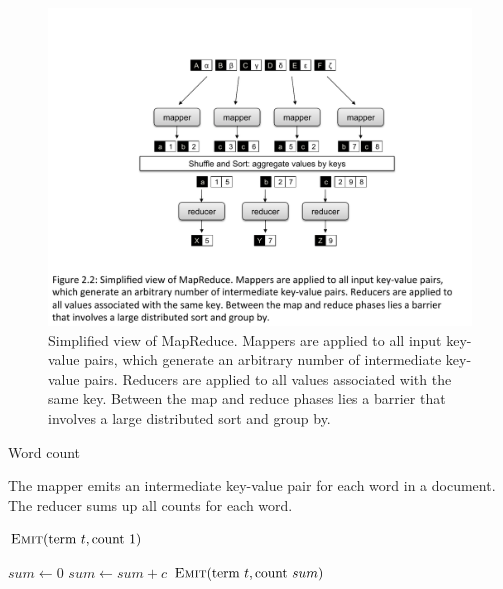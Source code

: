 \begin{figure}[p]
\begin{center}
\includegraphics[scale=0.6]{figures/fig-ch2-MapReduce-simple.pdf}
\end{center}
\caption{Simplified view of MapReduce.  Mappers are applied to all
  input key-value pairs, which generate an arbitrary number of
  intermediate key-value pairs.  Reducers are applied to all values
  associated with the same key.  Between the map and reduce phases
  lies a barrier that involves a large distributed sort and group by.}
\label{figure:chapter2:MapReduce-simple}
\end{figure}

\begin{algorithm}[p]
\caption{Word count}
\label{algorithm:chapter2:word-count:basic}
The mapper emits an intermediate key-value pair for each word in a
document. The reducer sums up all counts for each word.
\algrenewcommand{}
\algrenewcommand{}
  \begin{algorithmic}[1]
    \State $\textsc{Emit}(\textrm{term }t, \textrm{count }1)$
    \EndFor
    \EndProcedure
    \EndFunction
  \end{algorithmic}

  \begin{algorithmic}[1]
    \State $sum \gets 0$
    \State $sum \gets sum + c$
    \EndFor
    \State $\textsc{Emit}(\textrm{term }t, \textrm{count }sum)$
    \EndProcedure
    \EndFunction
  \end{algorithmic}
\end{algorithm}

